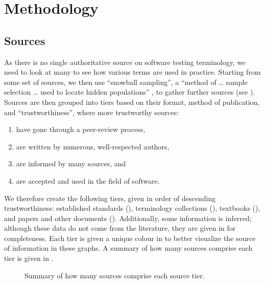 \section{Methodology}
\label{methodology}

\subsection{Sources}
\label{sources}
As there is no single authoritative source on software testing terminology,
we need to look at many to see how various terms are used in practice.
Starting from some set of sources, we then use
``snowball sampling'', a ``method of \dots{} sample selection \dots{} used to
locate hidden populations'' \citep{Johnson2014}, to gather further sources
(see ). Sources are then grouped into tiers based on their
format, method of publication, and ``trustworthiness'', where more trustworthy
sources:
\begin{enumerate}
    \item have gone through a peer-review process,
    \item are written by numerous, well-respected authors,
    \item are informed by many sources, and
    \item are accepted and used in the field of software.
\end{enumerate}

We therefore create the following tiers, given in order of descending
trustworthiness: established standards (), terminology
collections (), textbooks (), and papers and other
documents (). \ifnotpaper
    Additionally, some information is inferred; although these data do not come
    from the literature, they are given in  for completeness.
\fi Each tier is given a unique colour in  to better visualize the source of information in these
graphs. A summary of how many sources comprise each tier is given in
.

\begin{figure}
    \centering
    \caption{Summary of how many sources comprise each source tier.}
    \label{fig:sourceSummary}
\end{figure}

